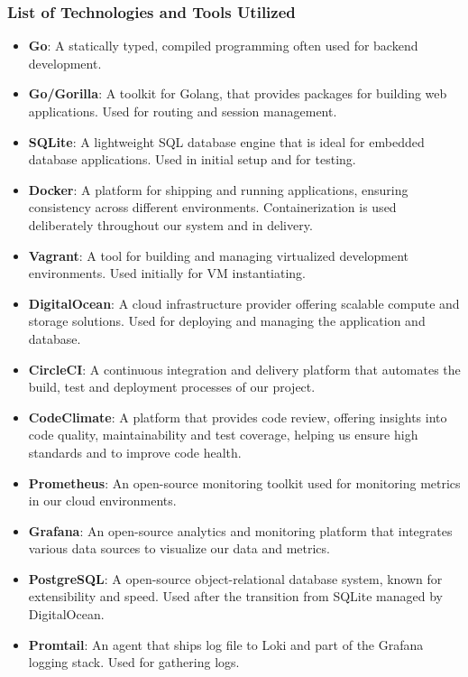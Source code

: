 \subsubsection*{List of Technologies and Tools Utilized}
\begin{multicols}{2}
    \begin{itemize}
        \item \textbf{Go}: A statically typed, compiled programming often used for backend development.
        \item \textbf{Go/Gorilla}: A toolkit for Golang, that provides packages for building web applications. Used for routing and session management.
        \item \textbf{SQLite}: A lightweight SQL database engine that is ideal for embedded database applications. Used in initial setup and for testing.
        \item \textbf{Docker}: A platform for shipping and running applications, ensuring consistency across different environments. Containerization is used deliberately throughout our system and in delivery.
        \item \textbf{Vagrant}: A tool for building and managing virtualized development environments. Used initially for VM instantiating.
        \item \textbf{DigitalOcean}: A cloud infrastructure provider offering scalable compute and storage solutions. Used for deploying and managing the application and database.
        \item \textbf{CircleCI}: A continuous integration and delivery platform that automates the build, test and deployment processes of our project.
        \item \textbf{CodeClimate}: A platform that provides code review, offering insights into code quality, maintainability and test coverage, helping us ensure high standards and to improve code health.
        \item \textbf{Prometheus}: An open-source monitoring toolkit used for monitoring metrics in our cloud environments.
        \item \textbf{Grafana}: An open-source analytics and monitoring platform that integrates various data sources to visualize our data and metrics.
        \item \textbf{PostgreSQL}: A open-source object-relational database system, known for extensibility and speed. Used after the transition from SQLite managed by DigitalOcean.
        \item \textbf{Promtail}: An agent that ships log file to Loki and part of the Grafana logging stack. Used for gathering logs.

\end{itemize}
\end{multicols}
